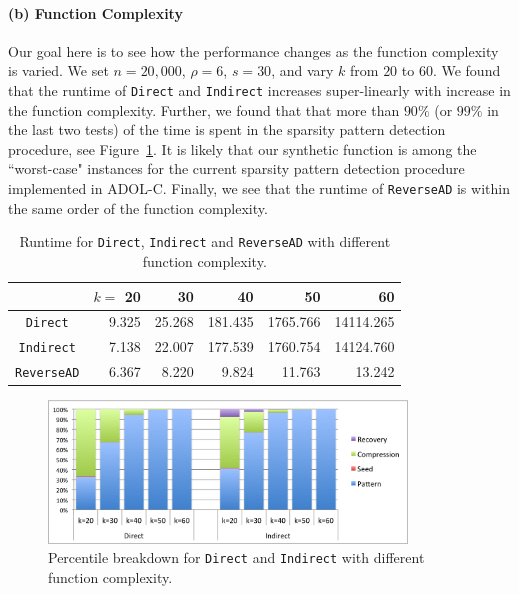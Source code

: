 \documentclass[final,leqno,onefignum,onetabnum]{siamart}
\begin{document}
\paragraph{(b) Function Complexity} 
Our goal here is to see how the performance changes as the function complexity is varied.
We set $n = 20,000$, $\rho = 6$, $s = 30$, and vary $k$ from $20$ to $60$. 
We found that the runtime of {\tt Direct} and {\tt Indirect} increases super-linearly with increase in the function complexity. Further, we found that that more than $90\%$ (or $99\%$ in the last two tests) of the time is spent in the sparsity pattern detection procedure, see Figure~\ref{fig:complexity-percentile}. It is likely that our synthetic function is among the ``worst-case" instances for the current sparsity pattern detection procedure implemented in ADOL-C.  Finally, we see that the runtime of {\tt ReverseAD} is within the same order of the function complexity.
\begin{table}[htbp]
\begin{center}
\begin{tabular}{ | c | r | r | r | r | r |}
\hline
 & $k=$ 20 & 30 & 40 & 50 & 60 \\
\hline
{\tt Direct} & 9.325 & 25.268 &181.435 &1765.766 & 14114.265\\
{\tt Indirect} & 7.138 & 22.007 & 177.539 & 1760.754 & 14124.760\\
{\tt ReverseAD}  & 6.367 & 8.220 & 9.824 & 11.763 & 13.242\\
\hline 
\end{tabular}
\caption*{Runtime for {\tt Direct}, {\tt Indirect} and {\tt ReverseAD} with different function complexity.}
\label{tab:complexity}
\end{center}
\end{table}

\begin{figure}[htbp]
        \centering
        \includegraphics[width=0.85\textwidth]{figures/pb}
        \caption{Percentile breakdown for {\tt Direct} and {\tt Indirect} with different function complexity.}
        \label{fig:complexity-percentile}
\end{figure}
\end{document}
